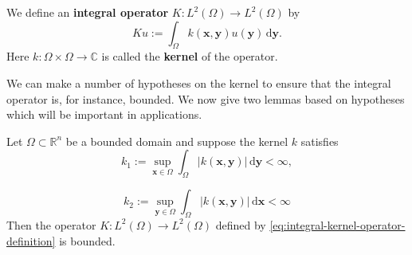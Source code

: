 \begin{Example}
\label{ex:integral-kernel-operator}
We define an \textbf{integral operator} $K:L^2(\Omega)\to L^2(\Omega)$ by
\begin{equation}\label{eq:integral-kernel-operator-definition}
Ku:=\int_{\Omega}k(\bm{x},\bm{y})u(\bm{y})\,\mathrm{d}\bm{y}.
\end{equation}
Here $k:\Omega\times\Omega\to\mathbb{C}$ is called the \textbf{kernel} of the operator.

We can make a number of hypotheses on the kernel to ensure that the integral operator is, for instance, bounded. We now give two lemmas based on hypotheses which will be important in applications.
\end{Example}

\begin{Lemma}
\label{lem:integral-kernel-row-column-boundedness}
Let $\Omega\subset\mathbb{R}^n$ be a bounded domain and suppose the kernel $k$ satisfies
\begin{equation}\label{eq:integral-kernel-uniform-row-bound}
k_1:=\sup_{\bm{x}\in\Omega}\int_{\Omega}|k(\bm{x},\bm{y})|\,\mathrm{d}\bm{y}<\infty,
\end{equation}

\begin{equation}\label{eq:integral-kernel-uniform-column-bound}
k_2:=\sup_{\bm{y}\in\Omega}\int_{\Omega}|k(\bm{x},\bm{y})|\,\mathrm{d}\bm{x}<\infty
\end{equation}
Then the operator $K:L^2(\Omega)\to L^2(\Omega)$ defined by \eqref{eq:integral-kernel-operator-definition} is bounded.
\end{Lemma}

\begingroup
{}
\renewcommand{\endProof}{\par\nobreak\hfill$\blacksquare$\par\vspace{0.1cm}}
\endgroup

